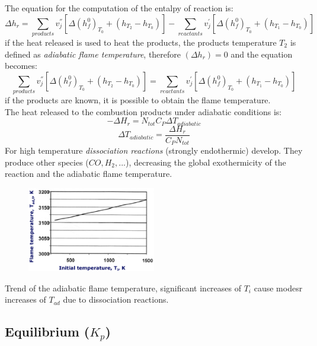 \documentclass[12pt]{article}
\begin{document}
The equation for the computation of the entalpy of reaction is:
\begin{equation}
    \Delta h_{r}= \sum_{products} v_{j}^{''}[\Delta (h_{f}^{0})_{T_{0}}+(h_{T_{2}}-h_{T_{0}})] -\sum_{reactants} v_{j}^{'}[\Delta (h_{f}^{0})_{T_{0}}+(h_{T_{1}}-h_{T_{0}})]
\end{equation}
if the heat released is used to heat the products, the products temperature $T_{2}$ is defined as \textit{adiabatic flame temperature}, therefore $(\Delta h_{r})=0$ and the equation becomes:
\begin{equation}
    \sum_{products} v_{j}^{''}[\Delta (h_{f}^{0})_{T_{0}}+(h_{T_{2}}-h_{T_{0}})] =\sum_{reactants} v_{j}^{'}[\Delta (h_{f}^{0})_{T_{0}}+(h_{T_{1}}-h_{T_{0}})]
\end{equation}
if the products are known, it is possible to obtain the flame temperature.
\\
The heat released to the combustion products under adiabatic conditions is:
\begin{equation}
    -\Delta H_{r} = N_{tot}C_{P}\Delta T_{adiabatic}
\end{equation}
\begin{equation}
    \Delta T_{adiabatic} = \frac{\Delta H_{r}}{C_{P}N_{tot}}
\end{equation}
 For high temperature \textit{dissociation reactions} (strongly endothermic) develop. They produce other species ($CO, H_{2},...$), decreasing the global exothermicity of the reaction and the adiabatic flame temperature.
\begin{figure}[h!]
\centering
\includegraphics[width=0.5\textwidth]{figures/dissociation.png}
\end{figure}
Trend of the adiabatic flame temperature, significant increases of $T_{i}$ cause modesr increases of $T_{ad}$ due to dissociation reactions.

\subsection{Equilibrium ($K_{p}$)}
\end{document}
